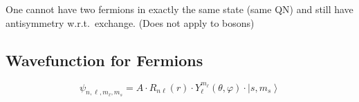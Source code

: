 \newpar{}

One cannot have two fermions in exactly the same state (same QN) and still have antisymmetry w.r.t.\ exchange. 
(Does not apply to bosons)
\subsection{Wavefunction for Fermions}
\noindent\begin{equation*}
    \psi_{n,\ell,m_\ell,m_s} = A\cdot R_{n\ell}(r)\cdot Y_\ell^{m_\ell}(\theta, \varphi) \cdot \left|s,m_s \right\rangle
\end{equation*}